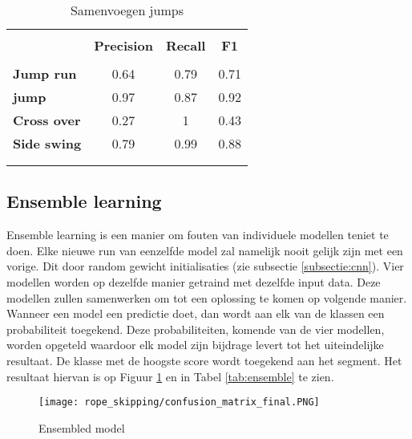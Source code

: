 \begin{table}[!htpd]
  \centering
  \caption{Samenvoegen jumps}
  \label{tab:samenvoegen}
\begin{tabular}{lccc}
 \hline \\
\textbf{}             & \textbf{Precision} & \textbf{Recall} & \textbf{F1} &  \\
\hline \\
\textbf{Jump run}  & 0.64               & 0.79            & 0.71        &  \\
\textbf{jump}       & 0.97               & 0.87           & 0.92        &  \\
\textbf{Cross over}   & 0.27               & 1               & 0.43        &  \\
\textbf{Side swing}   & 0.79                  & 0.99           & 0.88        & \\\\
\hline \\
\end{tabular}
\end{table}

\subsection{Ensemble learning}
Ensemble learning is een manier om fouten van individuele modellen teniet te doen. Elke nieuwe run van eenzelfde model zal namelijk nooit gelijk zijn met een vorige. Dit door random gewicht initialisaties (zie subsectie \ref{subsectie:cnn}). Vier modellen worden op dezelfde manier getraind met dezelfde input data. Deze modellen zullen samenwerken om tot een oplossing te komen op volgende manier. Wanneer een model een predictie doet, dan wordt aan elk van de klassen een probabiliteit toegekend. Deze probabiliteiten, komende van de vier modellen, worden opgeteld waardoor elk model zijn bijdrage levert tot het uiteindelijke resultaat. De klasse met de hoogste score wordt toegekend aan het segment. Het resultaat hiervan is op Figuur \ref{fig:ensemble} en in Tabel \ref{tab:ensemble} te zien.

\begin{figure}[!htpd]
\centering
\caption{Ensembled model}\label{fig:ensemble}
\texttt{[image: rope\_skipping/confusion\_matrix\_final.PNG]} 
\end{figure}

